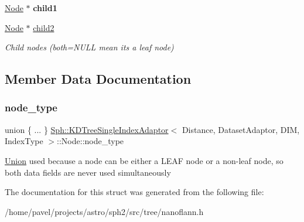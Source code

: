 \begin{DoxyCompactItemize}
\begin{tabbing}
\end{tabbing}\item 
\hypertarget{structSph_1_1KDTreeSingleIndexAdaptor_1_1Node_a744802d3870a701d8c688be4dcb19730}{}\label{structSph_1_1KDTreeSingleIndexAdaptor_1_1Node_a744802d3870a701d8c688be4dcb19730} 
\hyperlink{structSph_1_1KDTreeSingleIndexAdaptor_1_1Node}{Node} $\ast$ {\bfseries child1}
\item 
\hypertarget{structSph_1_1KDTreeSingleIndexAdaptor_1_1Node_a52db4680e40cb1d554380c60913bfc05}{}\label{structSph_1_1KDTreeSingleIndexAdaptor_1_1Node_a52db4680e40cb1d554380c60913bfc05} 
\hyperlink{structSph_1_1KDTreeSingleIndexAdaptor_1_1Node}{Node} $\ast$ \hyperlink{structSph_1_1KDTreeSingleIndexAdaptor_1_1Node_a52db4680e40cb1d554380c60913bfc05}{child2}
\begin{DoxyCompactList}\small\item\em Child nodes (both=N\+U\+LL mean its a leaf node) \end{DoxyCompactList}\end{DoxyCompactItemize}


\subsection{Member Data Documentation}
\hypertarget{structSph_1_1KDTreeSingleIndexAdaptor_1_1Node_a5b93ce4ef4b68d3222e41fcf4802d337}{}\label{structSph_1_1KDTreeSingleIndexAdaptor_1_1Node_a5b93ce4ef4b68d3222e41fcf4802d337} 
\subsubsection{\texorpdfstring{node\+\_\+type}{node\_type}}
{\footnotesize\ttfamily union \{ ... \}   \hyperlink{classSph_1_1KDTreeSingleIndexAdaptor}{Sph\+::\+K\+D\+Tree\+Single\+Index\+Adaptor}$<$ Distance, Dataset\+Adaptor, D\+IM, Index\+Type $>$\+::Node\+::node\+\_\+type}

\hyperlink{classUnion}{Union} used because a node can be either a L\+E\+AF node or a non-\/leaf node, so both data fields are never used simultaneously 

The documentation for this struct was generated from the following file\+:\begin{DoxyCompactItemize}
\item 
/home/pavel/projects/astro/sph2/src/tree/nanoflann.\+h\end{DoxyCompactItemize}

